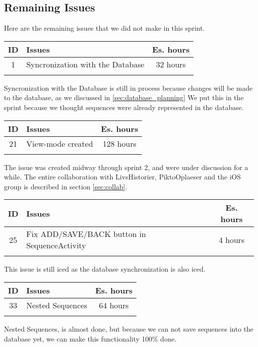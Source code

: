 \subsection{Remaining Issues}
\label{subsec:spr2_RemainingIssues}
Here are the remaining issues that we did not make in this sprint.

\begin{longtable} { | c | p{12cm} | c | } 
\hline
	ID 	&	Issues	&		 Es. hours \\\hline
	1	&	Syncronization with the Database 	&	32 hours	\\\hline
\label{tab:spr2_syncwithdatabase}
\end{longtable}

Syncronization with the Database is still in process because changes will be made to the database, as we discussed in \ref{sec:database_planning} We put this in the sprint because we thought sequences were already represented in the database.


\begin{longtable} { | c | p{12cm} | c | } 
\hline
	ID 	&	Issues	&		 Es. hours \\\hline
	21	&	View-mode created 	&	128 hours	\\\hline
\label{tab:spr2_viewmodecreated}
\end{longtable}

The issue was created midway through sprint 2, and were under discussion for a while. The entire collaboration with LivsHistorier, PiktoOplaeser and the iOS group is described in section \ref{sec:collab}.\\

\begin{longtable} { | c | p{12cm} | c | } 
\hline
	ID 	&	Issues	&		 Es. hours \\\hline
	25	&	Fix ADD/SAVE/BACK button in SequenceActivity 	&	4 hours	\\\hline
\label{tab:spr2_addsavebackbuttons}
\end{longtable}

This issue is still iced as the database synchronization is also iced.


\begin{longtable} { | c | p{12cm} | c | } 
\hline
	ID 	&	Issues	&		 Es. hours \\\hline
	33	&	Nested Sequences 	&	64 hours	\\\hline
\label{tab:spr2_nestedsequences}
\end{longtable}

Nested Sequences, is almost done, but because we can not save sequences into the database yet, we can make this functionality 100\% done.\\